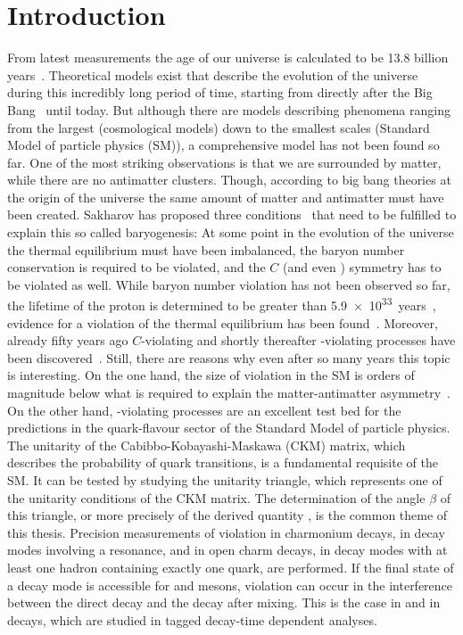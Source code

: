 
\chapter{Introduction}
\label{sec:Introduction}

From latest measurements the age of our universe is calculated to be
\num{13.8} billion years~\cite{Ade:2015xua}. Theoretical models exist that
describe the evolution of the universe during this incredibly long period of
time, starting from directly after the Big Bang~\cite{BigBang} until today.
But although there are models describing phenomena ranging from the largest
(cosmological models) down to the smallest scales (Standard Model of particle
physics (SM)), a comprehensive model has not been found so far. One of the
most striking observations is that we are surrounded by matter, while there
are no antimatter clusters. Though, according to big bang theories at the
origin of the universe the same amount of matter and antimatter must have been
created. Sakharov has proposed three conditions~\cite{Sakharov:1967dj} that
need to be fulfilled to explain this so called baryogenesis: At some point in
the evolution of the universe the thermal equilibrium must have been imbalanced,
the baryon number conservation is required to be violated, and the $C$ (and
even \CP) symmetry has to be violated as well. While baryon number violation
has not been observed so far, \eg the lifetime of the proton is determined to
be greater than \SI{5.9e33}{years}~\cite{Abe:2014mwa}, evidence for a
violation of the thermal equilibrium has been found~\cite{ThermalEquilibrium}.
Moreover, already fifty years ago $C$-violating and shortly thereafter
\CP-violating processes have been discovered~\cite{CPV_discovery}. Still,
there are reasons why even after so many years this topic is interesting. On
the one hand, the size of \CP violation in the SM is orders of magnitude below
what is required to explain the matter-antimatter
asymmetry~\cite{Huet:1994jb}. On the other hand, \CP-violating processes are
an excellent test bed for the predictions in the quark-flavour sector of the
Standard Model of particle physics. The unitarity of the
Cabibbo-Kobayashi-Maskawa (CKM) matrix, which describes the probability of
quark transitions, is a fundamental requisite of the SM. It can be tested by
studying the unitarity triangle, which represents one of the unitarity
conditions of the CKM matrix. The determination of the angle $\beta$ of this
triangle, or more precisely of the derived quantity \sintwobeta, is the common
theme of this thesis. Precision measurements of \CP violation in charmonium
decays, \ie in decay modes involving a \ccbar resonance, and in open charm
decays, \ie in decay modes with at least one hadron containing exactly one
\cquark quark, are performed. If the final state of a decay mode is
accessible for \Bz and \Bzb mesons, \CP violation can occur in the
interference between the direct decay and the decay after mixing. This is the
case in \BdToJPsiKS and in \BdToDD decays, which are studied in tagged
decay-time dependent analyses.

